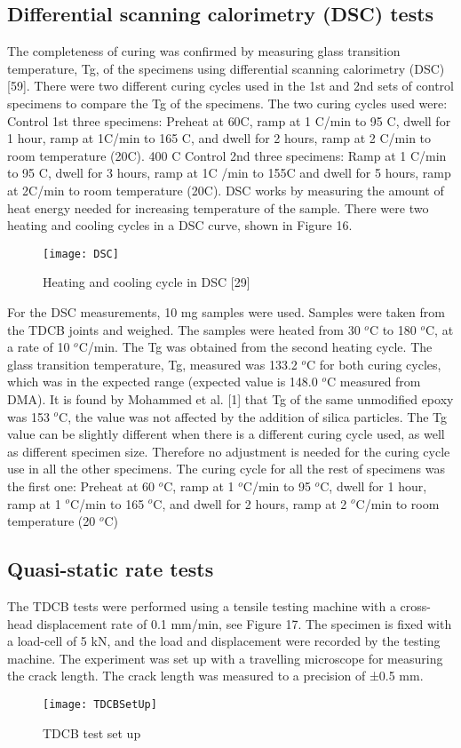 \documentclass[numbers=noendperiod,chapterprefix=on]{icldt} %
\begin{document}
\subsection{Differential scanning calorimetry (DSC) tests}
The completeness of curing was confirmed by measuring glass transition temperature, Tg, of the specimens using differential scanning calorimetry (DSC) [59]. There were two different curing cycles used in the 1st and 2nd sets of control specimens to compare the Tg of the specimens.
The two curing cycles used were:
Control 1st three specimens: Preheat at 60\degree C, ramp at 1 \degree C/min to 95 \degree C, dwell for 1 hour, ramp at 1\degree C/min to 165 \degree C, and dwell for 2 hours, ramp at 2 \degree C/min to room temperature (20\degree C). 400 \degree C 
Control 2nd three specimens: Ramp at 1 \degree C/min to 95 \degree C, dwell for 3 hours, ramp at 1\degree C /min to 155\degree C and dwell for 5 hours, ramp at 2\degree C/min to room temperature (20\degree C).
DSC works by measuring the amount of heat energy needed for increasing temperature of the sample. There were two heating and cooling cycles in a DSC curve, shown in Figure 16.

\begin{figure}[!htpb]
\centering
\texttt{[image: DSC]}
\caption{Heating and cooling cycle in DSC [29]} %
\end{figure}

For the DSC measurements, 10 mg samples were used. Samples were taken from the TDCB joints and weighed. The samples were heated from 30 $^o$C to 180 $^o$C, at a rate of 10 $^o$C/min. The Tg was obtained from the second heating cycle. The glass transition temperature, Tg, measured was 133.2 $^o$C for both curing cycles, which was in the expected range (expected value is 148.0 $^o$C measured from DMA). It is found by Mohammed et al. [1] that Tg of the same unmodified epoxy was 153 $^o$C, the value was not affected by the addition of silica particles. The Tg value can be slightly different when there is a different curing cycle used, as well as different specimen size. Therefore no adjustment is needed for the curing cycle use in all the other specimens. The curing cycle for all the rest of specimens was the first one: Preheat at 60 $^o$C, ramp at 1 $^o$C/min to 95 $^o$C, dwell for 1 hour, ramp at 1 $^o$C/min to 165 $^o$C, and dwell for 2 hours, ramp at 2 $^o$C/min to room temperature (20 $^o$C)

\subsection{Quasi-static rate tests}
The TDCB tests were performed using a tensile testing machine with a cross-head displacement rate of 0.1 mm/min, see Figure 17. The specimen is fixed with a load-cell of 5 kN, and the load and displacement were recorded by the testing machine. The experiment was set up with a travelling microscope for measuring the crack length. The crack length was measured to a precision of ±0.5 mm.
\begin{figure}[!htpb]
\centering
\texttt{[image: TDCBSetUp]}
\caption{TDCB test set up} %
\end{figure}
\FloatBarrier
\end{document}
